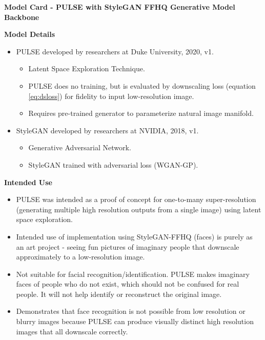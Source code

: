 \documentclass[10pt,twocolumn,letterpaper]{article}
\begin{document}
\begin{figure*}[ht]  \label{fig:modelcard} 
\begin{tcolorbox}[
    sharp corners,
    colback=white,
    colframe=black
    ]
\begin{center}
\Large\textbf{Model Card - PULSE with StyleGAN FFHQ Generative Model Backbone} \\
\end{center}
\small
\textbf{Model Details}
\begin{itemize}
    \item PULSE developed by researchers at Duke University, 2020, v1.
    \begin{itemize}
        \item Latent Space Exploration Technique.
        \item PULSE does no training, but is evaluated by downscaling loss (equation \ref{eq:dsloss}) for fidelity to input low-resolution image.
        \item Requires pre-trained generator to parameterize natural image manifold.
    \end{itemize}
    \item StyleGAN developed by researchers at NVIDIA, 2018, v1.
    \begin{itemize}
        \item Generative Adversarial Network.
        \item StyleGAN trained with adversarial loss (WGAN-GP).
    \end{itemize}
\end{itemize}
\textbf{Intended Use}
\begin{itemize}
    \item PULSE was intended as a proof of concept for one-to-many super-resolution (generating multiple high resolution outputs from a single image) using latent space exploration.
    \item Intended use of implementation using StyleGAN-FFHQ (faces) is purely as an art project - seeing fun pictures of imaginary people that downscale approximately to a low-resolution image.
    \item Not suitable for facial recognition/identification. PULSE makes imaginary faces of people who do not exist, which should not be confused for real people. It will not help identify or reconstruct the original image.
    \item Demonstrates that face recognition is not possible from low resolution or blurry images because PULSE can produce visually distinct high resolution images that all downscale correctly.

\end{itemize}
\end{tcolorbox}
\end{figure*}
\end{document}
